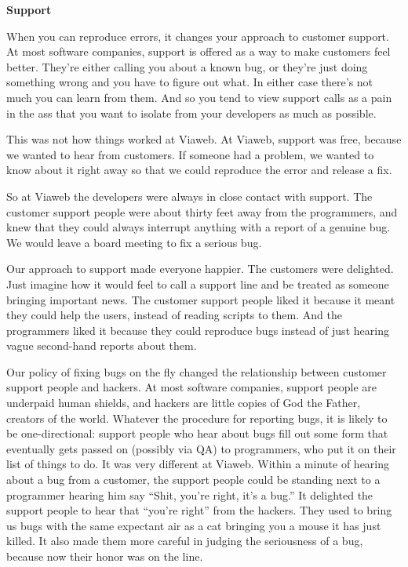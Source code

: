 \textbf{Support}

When you can reproduce errors, it changes your approach to customer
support. At most software companies, support is offered as a way to make
customers feel better. They're either calling you about a known bug, or
they're just doing something wrong and you have to figure out what. In
either case there's not much you can learn from them. And so you tend to
view support calls as a pain in the ass that you want to isolate from
your developers as much as possible.

This was not how things worked at Viaweb. At Viaweb, support was free,
because we wanted to hear from customers. If someone had a problem, we
wanted to know about it right away so that we could reproduce the error
and release a fix.

So at Viaweb the developers were always in close contact with support.
The customer support people were about thirty feet away from the
programmers, and knew that they could always interrupt anything with a
report of a genuine bug. We would leave a board meeting to fix a serious
bug.

Our approach to support made everyone happier. The customers were
delighted. Just imagine how it would feel to call a support line and be
treated as someone bringing important news. The customer support people
liked it because it meant they could help the users, instead of reading
scripts to them. And the programmers liked it because they could
reproduce bugs instead of just hearing vague second-hand reports about
them.

Our policy of fixing bugs on the fly changed the relationship between
customer support people and hackers. At most software companies, support
people are underpaid human shields, and hackers are little copies of God
the Father, creators of the world. Whatever the procedure for reporting
bugs, it is likely to be one-directional: support people who hear about
bugs fill out some form that eventually gets passed on (possibly via QA)
to programmers, who put it on their list of things to do. It was very
different at Viaweb. Within a minute of hearing about a bug from a
customer, the support people could be standing next to a programmer
hearing him say ``Shit, you're right, it's a bug.'' It delighted the
support people to hear that ``you're right'' from the hackers. They used
to bring us bugs with the same expectant air as a cat bringing you a
mouse it has just killed. It also made them more careful in judging the
seriousness of a bug, because now their honor was on the line.

